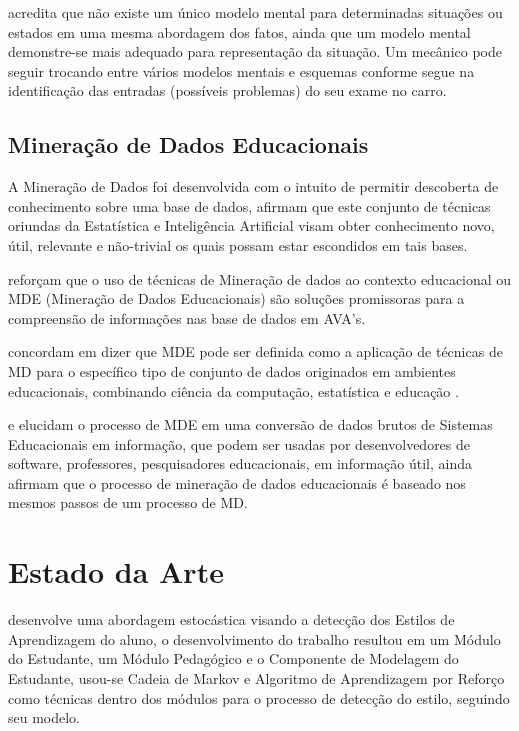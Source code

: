 \documentclass[12pt]{article}
\begin{document}
\cite{Moreira1996} acredita que não existe um único modelo mental para determinadas situações ou estados em uma mesma abordagem dos fatos, ainda que um modelo mental demonstre-se mais adequado para representação da situação. Um mecânico pode seguir trocando entre vários modelos mentais e esquemas conforme segue na identificação das entradas (possíveis problemas) do seu exame no carro.

\subsection{Mineração de Dados Educacionais}

A Mineração de Dados foi desenvolvida com o intuito de permitir descoberta de conhecimento sobre uma base de dados, \cite{Goldschmidt_Passos_2005} afirmam que este conjunto de técnicas oriundas da Estatística e Inteligência Artificial visam obter conhecimento novo, útil, relevante e não-trivial os quais possam estar escondidos em tais bases.

\cite{Leite_et_al_2016} reforçam que o uso de técnicas de Mineração de dados ao contexto educacional ou MDE (Mineração de Dados Educacionais) são soluções promissoras para a compreensão de informações nas base de dados em AVA's.

\cite{Romero_Ventura_2013} concordam em dizer que MDE pode ser definida como a aplicação de técnicas de MD para o específico tipo de conjunto de dados originados em ambientes educacionais, combinando ciência da computação, estatística e educação .

\cite{Garcia_et_al_2011} e \cite{Santos2016} elucidam o processo de MDE em uma conversão de dados brutos de Sistemas Educacionais em informação, que podem ser usadas por desenvolvedores de software, professores, pesquisadores educacionais, em informação útil, \cite{Garcia_et_al_2011} ainda afirmam que o processo de mineração de dados educacionais é baseado nos mesmos passos de um processo de MD.

\section{Estado da Arte}

\cite{Dorca2012} desenvolve uma abordagem estocástica visando a detecção dos Estilos de Aprendizagem do aluno, o desenvolvimento do trabalho resultou em um Módulo do Estudante, um Módulo Pedagógico e o Componente de Modelagem do Estudante, usou-se Cadeia de Markov e Algoritmo de Aprendizagem por Reforço como técnicas dentro dos módulos para o processo de detecção do estilo, seguindo seu modelo.
\end{document}
